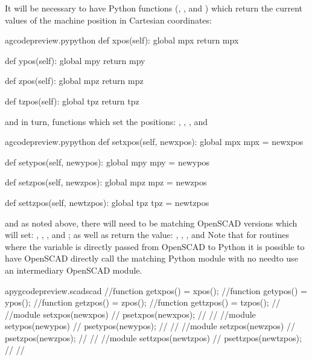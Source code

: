 \documentclass{ltxdoc}
\begin{document}
It will be necessary to have Python functions (, , and ) which return the current values of the machine position in Cartesian coordinates: 

\lstset{firstnumber=\thegcpy}
\begin{writecode}{a}{gcodepreview.py}{python}
    def xpos(self):
        global mpx
        return mpx

    def ypos(self):
        global mpy
        return mpy

    def zpos(self):
        global mpz
        return mpz

    def tzpos(self):
        global tpz
        return tpz

\end{writecode}
\addtocounter{gcpy}{16}

\noindent and in turn, functions which set the positions: 
,
,
, and

\lstset{firstnumber=\thegcpy}
\begin{writecode}{a}{gcodepreview.py}{python}
    def setxpos(self, newxpos):
        global mpx
        mpx = newxpos

    def setypos(self, newypos):
        global mpy
        mpy = newypos

    def setzpos(self, newzpos):
        global mpz
        mpz = newzpos
     
    def settzpos(self, newtzpos):
        global tpz
        tpz = newtzpos

\end{writecode}
\addtocounter{gcpy}{16}
 
\noindent and as noted above, there will need to be matching OpenSCAD versions which will set: , , , and ; as well as return the value: , , , and  Note that for routines where the variable is directly passed from OpenSCAD to Python it is possible to have OpenSCAD directly call the matching Python module with no needto use an intermediary OpenSCAD module.
 
\lstset{firstnumber=\thepyscad}
\begin{writecode}{a}{pygcodepreview.scad}{scad}
//function getxpos() = xpos();
//function getypos() = ypos();
//function getzpos() = zpos();
//function gettzpos() = tzpos();
//
//module setxpos(newxpos) {
//    psetxpos(newxpos);
//}
//
//module setypos(newypos) {
//    psetypos(newypos);
//}
//
//module setzpos(newzpos) {
//    psetzpos(newzpos);
//}
//
//module settzpos(newtzpos) {
//    psettzpos(newtzpos);
//}
//
\end{writecode}
\addtocounter{pyscad}{21}
 
\end{document}
